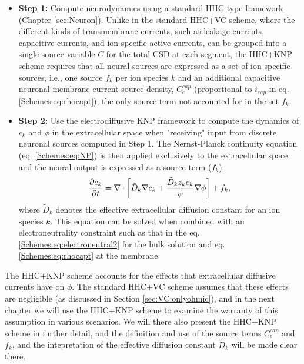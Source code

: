\begin{itemize}
\item {\bf Step 1:} Compute neurodynamics using a standard HHC-type framework (Chapter \ref{sec:Neuron}). Unlike in the standard HHC+VC scheme, where the different kinds of transmembrane currents, such as leakage currents, capacitive currents, and ion specific active currents, can be grouped into a single source variable $C$ for the total CSD at each segment, the HHC+KNP scheme requires that all neural sources are expressed as a set of ion specific sources, i.e., one source $f_k$ per ion species $k$ and an additional capacitive neuronal membrane current source density, $C_e^{cap}$ (proportional to $i_{cap}$ in eq. \ref{Schemes:eq:rhocapt}), the only source term not accounted for in the set $f_k$.

\item {\bf Step 2:} Use the electrodiffusive KNP framework to compute the dynamics of $c_k$ and $\phi$ in the extracellular space when "receiving" input from discrete neuronal sources computed in Step 1. The Nernst-Planck continuity equation (eq. \ref{Schemes:eq:NP}) is then applied exclusively to the extracellular space, and the neural output is expressed as a source term ($f_k$):
\begin{equation}
\frac{\partial c_k}{\partial t} = {\bf \nabla} \cdot \left[ \tilde{D}_k {\bf \nabla} c_k + \frac{\tilde{D}_k z_k c_k}{\psi} {\bf \nabla} \phi \right] + f_k, 
\label{Schemes:eq:NPe}
\end{equation}
where $\tilde{D}_k$ denotes the effective extracellular diffusion constant for an ion species $k$. This equation can be solved when combined with an electroneutrality constraint such as that in the 
eq. \ref{Schemes:eq:electroneutral2} for the bulk solution and eq. \ref{Schemes:eq:rhocapt} at the membrane. 
\end{itemize}

The HHC+KNP scheme accounts for the effects that extracellular diffusive currents have on $\phi$.
The standard HHC+VC scheme assumes that these effects are negligible (as discussed in Section \ref{sec:VC:onlyohmic}), and in the next chapter we will use the HHC+KNP scheme to examine the warranty of this assumption in various scenarios. We will there also present the HHC+KNP scheme in further detail, and the definition and use of the source terms  $C_e^{cap}$ and  $f_k$, and the intepretation of the effective diffusion constant $\tilde{D}_k$ will be made clear there. 



